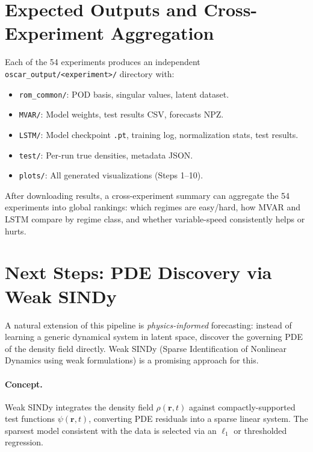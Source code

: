 \documentclass[11pt]{article}
\begin{document}
\section{Expected Outputs and Cross-Experiment Aggregation}
\label{sec:outputs}

Each of the 54 experiments produces an independent
\texttt{oscar\_output/<experiment>/} directory with:

\begin{itemize}[nosep]
    \item \texttt{rom\_common/}: POD basis, singular values, latent dataset.
    \item \texttt{MVAR/}: Model weights, test results CSV, forecasts NPZ.
    \item \texttt{LSTM/}: Model checkpoint \texttt{.pt}, training log, normalization stats, test results.
    \item \texttt{test/}: Per-run true densities, metadata JSON.
    \item \texttt{plots/}: All generated visualizations (Steps 1--10).
\end{itemize}

After downloading results, a cross-experiment summary can aggregate the
54 experiments into global rankings: which regimes are easy/hard, how
MVAR and LSTM compare by regime class, and whether variable-speed
consistently helps or hurts.


\section{Next Steps: PDE Discovery via Weak SINDy}
\label{sec:wsindy}

A natural extension of this pipeline is \emph{physics-informed}
forecasting: instead of learning a generic dynamical system in latent
space, discover the governing PDE of the density field directly.  Weak
SINDy (Sparse Identification of Nonlinear Dynamics using weak
formulations) is a promising approach for this.

\paragraph{Concept.}
Weak SINDy integrates the density field $\rho(\mathbf{r}, t)$ against
compactly-supported test functions $\psi(\mathbf{r}, t)$, converting
PDE residuals into a sparse linear system.  The sparsest model
consistent with the data is selected via an $\ell_1$ or thresholded
regression.
\end{document}
